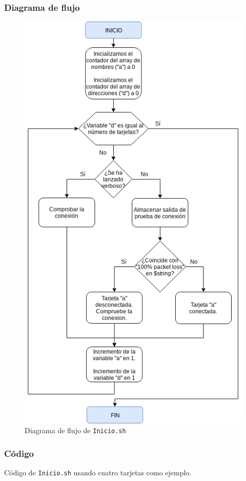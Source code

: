 \subsubsection{Diagrama de flujo}
\begin{figure}[h]
	\centering
	\includegraphics[scale=0.562]{Anexos/Anexo2/Test/Inicio.png}
	\caption{Diagrama de flujo de \texttt{Inicio.sh}}
	\label{Diagrama de flujo de Inicio.sh}
\end{figure}

\newpage
\subsubsection{Código}

\begin{center}
	Código de \texttt{Inicio.sh} usando cuatro tarjetas como ejemplo.
\end{center}

